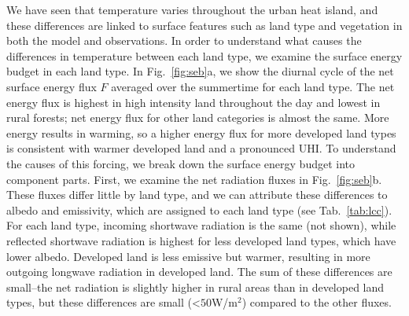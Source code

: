 \documentclass[draft,linenumbers]{agujournal}
\begin{document}
We have seen that temperature varies throughout the urban heat island, and these differences are linked to surface features such as land type and vegetation in both the model and observations. 
In order to understand what causes the differences in temperature between each land type, we examine the surface energy budget in each land type. 
 In Fig.~\ref{fig:seb}a, we show the diurnal cycle of the net surface energy flux $F$ averaged over the summertime for each land type. The net energy flux is highest in high intensity land throughout the day and lowest in rural forests; net energy flux for other land categories is almost the same. More energy results in warming, so a higher energy flux for more developed land types is consistent with warmer developed land and a pronounced UHI. 
 To understand the causes of this forcing, we break down the surface energy budget into component parts. First, we examine the net radiation fluxes in Fig.~\ref{fig:seb}b. These fluxes differ little by land type, and we can attribute these differences to albedo and emissivity, which are assigned to each land type (see Tab.~\ref{tab:lcc}). 
For each land type, incoming shortwave radiation is the same (not shown), while reflected shortwave radiation is highest for less developed land types, which have lower albedo. 
Developed land is less emissive but warmer, resulting in more outgoing longwave radiation in developed land. %
The sum of these differences are small--the net radiation is slightly higher in rural areas than in developed land types, but these differences are small (<$50$W/m$^2$) compared to the other fluxes. 
\end{document}

